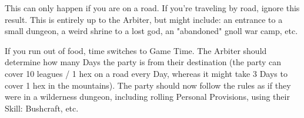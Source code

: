\cbreak


  This can only happen if you are  on a road. If you're traveling by road, ignore this result.  This is entirely up to the Arbiter, but might include: an entrance to a small dungeon, a weird shrine to a lost god, an "abandoned" gnoll war camp, etc.



  If you run out of food, time switches to Game Time.  The Arbiter should determine how many Days the party is from their destination (the party can cover 10 leagues / 1 hex on a road every Day, whereas it might take 3 Days to cover 1 hex in the mountains).  The party should now follow the rules as if they were in a wilderness dungeon, including rolling Personal Provisions, using their Skill: Bushcraft, etc. 

